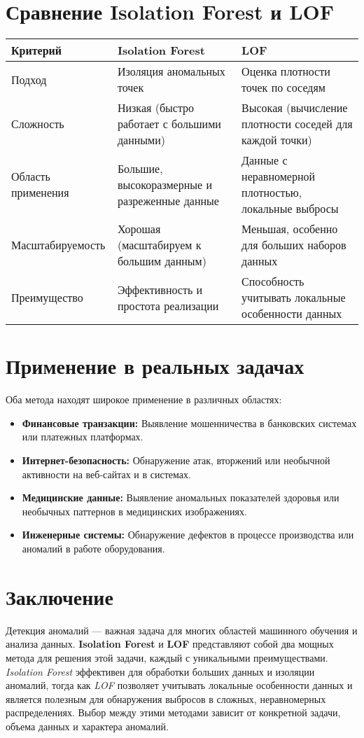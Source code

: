 \section{Сравнение Isolation Forest и LOF}
\begin{tabular}{|l|l|l|}
\hline
\textbf{Критерий} & \textbf{Isolation Forest} & \textbf{LOF} \\
\hline
Подход & Изоляция аномальных точек & Оценка плотности точек по соседям \\
Сложность & Низкая (быстро работает с большими данными) & Высокая (вычисление плотности соседей для каждой точки) \\
Область применения & Большие, высокоразмерные и разреженные данные & Данные с неравномерной плотностью, локальные выбросы \\
Масштабируемость & Хорошая (масштабируем к большим данным) & Меньшая, особенно для больших наборов данных \\
Преимущество & Эффективность и простота реализации & Способность учитывать локальные особенности данных \\
\hline
\end{tabular}

\section{Применение в реальных задачах}
Оба метода находят широкое применение в различных областях:
\begin{itemize}
    \item \textbf{Финансовые транзакции:} Выявление мошенничества в банковских системах или платежных платформах.
    \item \textbf{Интернет-безопасность:} Обнаружение атак, вторжений или необычной активности на веб-сайтах и в системах.
    \item \textbf{Медицинские данные:} Выявление аномальных показателей здоровья или необычных паттернов в медицинских изображениях.
    \item \textbf{Инженерные системы:} Обнаружение дефектов в процессе производства или аномалий в работе оборудования.
\end{itemize}

\section{Заключение}
Детекция аномалий — важная задача для многих областей машинного обучения и анализа данных. \textbf{Isolation Forest} и \textbf{LOF} представляют собой два мощных метода для решения этой задачи, каждый с уникальными преимуществами. \textit{Isolation Forest} эффективен для обработки больших данных и изоляции аномалий, тогда как \textit{LOF} позволяет учитывать локальные особенности данных и является полезным для обнаружения выбросов в сложных, неравномерных распределениях. Выбор между этими методами зависит от конкретной задачи, объема данных и характера аномалий.

